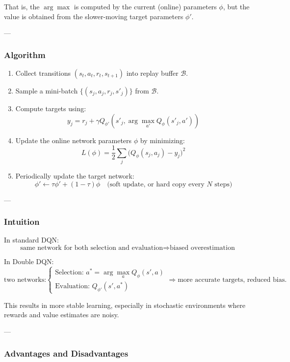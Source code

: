 \documentclass[12pt]{article}
\theoremstyle{definition} %
\theoremstyle{plain} %
\theoremstyle{remark} %
\begin{document}
\begin{CJK}{UTF8}{gbsn}
That is, the $\arg\max$ is computed by the current (online) parameters $\phi$, 
but the value is obtained from the slower-moving target parameters $\phi'$.

---

\subsubsection*{Algorithm}

\begin{enumerate}
    \item Collect transitions $(s_t, a_t, r_t, s_{t+1})$ into replay buffer $\mathcal{B}$.
    \item Sample a mini-batch $\{ (s_j, a_j, r_j, s'_j) \}$ from $\mathcal{B}$.
    \item Compute targets using:
    \[
    y_j = r_j + \gamma 
    Q_{\phi'}(s'_j, \arg\max_{a'} Q_{\phi}(s'_j, a'))
    \]
    \item Update the online network parameters $\phi$ by minimizing:
    \[
    L(\phi) = 
    \frac{1}{2} \sum_j 
    \bigl(
    Q_{\phi}(s_j, a_j) - y_j
    \bigr)^2
    \]
    \item Periodically update the target network:
    \[
    \phi' \leftarrow \tau \phi' + (1 - \tau)\phi
    \quad \text{(soft update, or hard copy every $N$ steps)}
    \]
\end{enumerate}

---

\subsubsection*{Intuition}

In standard DQN:
\[
\text{same network for both selection and evaluation} 
\Rightarrow 
\text{biased overestimation}
\]

In Double DQN:
\[
\text{two networks:}
\begin{cases}
\text{Selection: } a^* = \arg\max_a Q_{\phi}(s', a) \\
\text{Evaluation: } Q_{\phi'}(s', a^*)
\end{cases}
\Rightarrow 
\text{more accurate targets, reduced bias.}
\]

This results in more stable learning, especially in stochastic environments where rewards and value estimates are noisy.

---

\subsubsection*{Advantages and Disadvantages}


\end{CJK}
\end{document}
